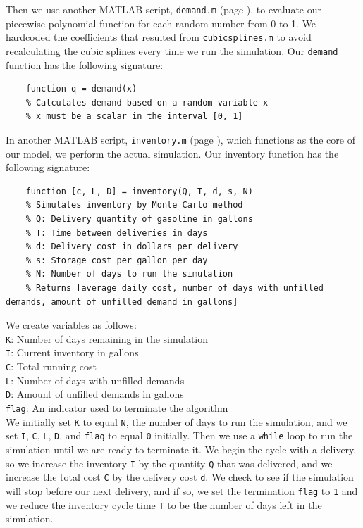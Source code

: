 \documentclass{article}
\begin{document}
    Then we use another MATLAB script, \texttt{demand.m} (page \pageref{code:demand}), to evaluate our piecewise polynomial function for each random number from 0 to 1. We hardcoded the coefficients that resulted from \texttt{cubicsplines.m} to avoid recalculating the cubic splines every time we run the simulation. Our \texttt{demand} function has the following signature:
    \begin{verbatim}
    function q = demand(x)
    % Calculates demand based on a random variable x
    % x must be a scalar in the interval [0, 1]
    \end{verbatim}
    In another MATLAB script, \texttt{inventory.m} (page \pageref{code:inventory}), which functions as the core of our model, we perform the actual simulation. Our inventory function has the following signature:
    \begin{verbatim}
    function [c, L, D] = inventory(Q, T, d, s, N)
    % Simulates inventory by Monte Carlo method
    % Q: Delivery quantity of gasoline in gallons
    % T: Time between deliveries in days
    % d: Delivery cost in dollars per delivery
    % s: Storage cost per gallon per day
    % N: Number of days to run the simulation
    % Returns [average daily cost, number of days with unfilled demands, amount of unfilled demand in gallons]
    \end{verbatim}
    We create variables as follows:\\
    \texttt{K}: Number of days remaining in the simulation\\
    \texttt{I}: Current inventory in gallons\\
    \texttt{C}: Total running cost\\
    \texttt{L}: Number of days with unfilled demands\\
    \texttt{D}: Amount of unfilled demands in gallons\\
    \texttt{flag}: An indicator used to terminate the algorithm\\

    \pagebreak
    We initially set \texttt{K} to equal \texttt{N}, the number of days to run the simulation, and we set \texttt{I}, \texttt{C}, \texttt{L}, \texttt{D}, and \texttt{flag} to equal \texttt{0} initially. Then we use a \texttt{while} loop to run the simulation until we are ready to terminate it. We begin the cycle with a delivery, so we increase the inventory \texttt{I} by the quantity \texttt{Q} that was delivered, and we increase the total cost \texttt{C} by the delivery cost \texttt{d}. We check to see if the simulation will stop before our next delivery, and if so, we set the termination \texttt{flag} to \texttt{1} and we reduce the inventory cycle time \texttt{T} to be the number of days left in the simulation.
\end{document}

